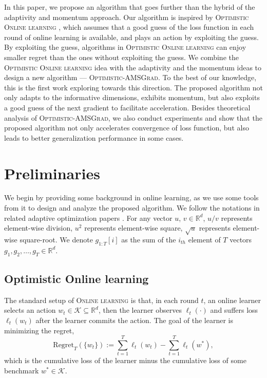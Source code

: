 \documentclass[11pt]{article}
\def\K{\mathcal{K}}
\theoremstyle{k}
\begin{document}
In this paper, we propose an algorithm that goes further than the hybrid of the adaptivity and momentum approach. Our algorithm is inspired by \textsc{Optimistic Online learning} \cite{CJ12,RS13,SALS15,ALLW18}, which assumes that a good guess of the loss function in each round of online learning is available, and plays an action by exploiting the guess. 
By exploiting the guess, algorithms in 
\textsc{Optimistic Online learning}
can enjoy smaller regret than the ones without exploiting the guess.
We combine the \textsc{Optimistic Online learning} idea with the adaptivity and the momentum ideas to design a new algorithm --- \textsc{Optimistic-AMSGrad}. To the best of our knowledge, this is the first work exploring towards this direction. The proposed algorithm
not only adapts to the informative dimensions, exhibits momentum, but also exploits a good guess of the next gradient to facilitate acceleration. Besides theoretical analysis of \textsc{Optimistic-AMSGrad}, we also conduct experiments and show that the proposed algorithm not only accelerates convergence of loss function, but also leads to better generalization performance in some cases.

\section{Preliminaries}
We begin by providing some background in online learning, as we use some tools from it to 
design and analyze the proposed algorithm.
We follow the notations in related adaptive optimization papers \cite{KB15,RKK18}. For any vector $u$, $v \in \mathbb R^{d}$,  $u/v$ represents element-wise division,
$u^{2}$ represents element-wise square, $\sqrt{u}$ represents element-wise square-root.
We denote $g_{1:T}[i]$ as the sum of the $i_{th}$ element of $T$ vectors $g_{1}, g_{2},
\dots, g_{T} \in \mathbb R^{d}$.

\subsection{Optimistic Online learning}
The standard setup of \textsc{Online learning} is that,
in each round $t$, an online learner selects an action $w_{t} \in \K \subseteq \mathbb R^{d}$,
then the learner observes $\ell_{t}(\cdot)$ and suffers loss $\ell_{t}(w_t)$
after the learner commits the action.
The goal of the learner is minimizing the regret,
$$\text{Regret}_{T}( \{ w_t \} ):= \sum_{t=1}^T \ell_{t}(w_t) - \sum_{t=1}^T \ell_{t}(w^*),$$
which is the cumulative loss of the learner minus the cumulative loss of
some benchmark $w^{*} \in \K$.
\end{document}
